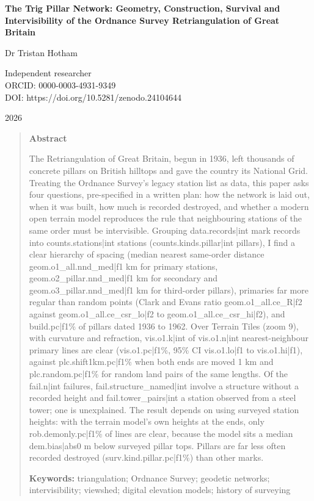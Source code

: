 \documentclass[11pt,a4paper]{article}
\begin{document}
\begin{center}
{\Large\bfseries The Trig Pillar Network: Geometry, Construction, Survival and Intervisibility of the Ordnance Survey Retriangulation of Great Britain\par}
\vspace{1.2em}
{\large Dr Tristan Hotham\par}
\vspace{0.3em}
{\small Independent researcher\\
ORCID: 0000-0003-4931-9349\\
DOI: https://doi.org/10.5281/zenodo.24104644\par}
\vspace{0.8em}
2026
\end{center}

\begin{quote}
\small
\begin{center}\textbf{Abstract}\end{center}
The Retriangulation of Great Britain, begun in 1936, left thousands of concrete pillars on British hilltops and gave the country its National Grid. Treating the Ordnance Survey's legacy station list as data, this paper asks four questions, pre-specified in a written plan: how the network is laid out, when it was built, how much is recorded destroyed, and whether a modern open terrain model reproduces the rule that neighbouring stations of the same order must be intervisible. Grouping {{data.records|int}} mark records into {{counts.stations|int}} stations ({{counts.kinds.pillar|int}} pillars), I find a clear hierarchy of spacing (median nearest same-order distance {{geom.o1_all.nnd_med|f1}} km for primary stations, {{geom.o2_pillar.nnd_med|f1}} km for secondary and {{geom.o3_pillar.nnd_med|f1}} km for third-order pillars), primaries far more regular than random points (Clark and Evans ratio {{geom.o1_all.ce_R|f2}} against {{geom.o1_all.ce_csr_lo|f2}} to {{geom.o1_all.ce_csr_hi|f2}}), and {{build.pc|f1}}\% of pillars dated 1936 to 1962. Over Terrain Tiles (zoom 9), with curvature and refraction, {{vis.o1.k|int}} of {{vis.o1.n|int}} nearest-neighbour primary lines are clear ({{vis.o1.pc|f1}}\%, 95\% CI {{vis.o1.lo|f1}} to {{vis.o1.hi|f1}}), against {{plc.shift1km.pc|f1}}\% when both ends are moved 1 km and {{plc.random.pc|f1}}\% for random land pairs of the same lengths. Of the {{fail.n|int}} failures, {{fail.structure_named|int}} involve a structure without a recorded height and {{fail.tower_pairs|int}} a station observed from a steel tower; one is unexplained. The result depends on using surveyed station heights: with the terrain model's own heights at the ends, only {{rob.demonly.pc|f1}}\% of lines are clear, because the model sits a median {{dem.bias|abs0}} m below surveyed pillar tops. Pillars are far less often recorded destroyed ({{surv.kind.pillar.pc|f1}}\%) than other marks.

\textbf{Keywords:} triangulation; Ordnance Survey; geodetic networks; intervisibility; viewshed; digital elevation models; history of surveying
\end{quote}
\end{document}
